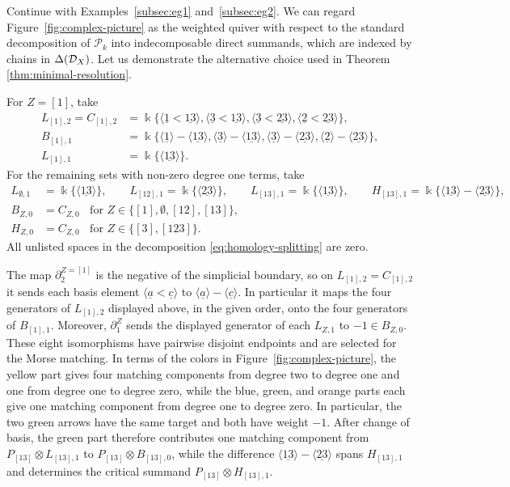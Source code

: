 \documentclass[a4paper,leqno]{amsart}
\begin{document}
\begin{eg}\label{eg:morse-matching-change-of-basis}
Continue with Examples~\ref{subsec:eg1} and~\ref{subsec:eg2}. We can regard Figure~\ref{fig:complex-picture} as the weighted quiver with respect to the standard decomposition of $\mathcal{P}_k$ into indecomposable direct summands, which are indexed by chains in $\Delta(\mathcal D_X)$. Let us demonstrate the alternative choice used in Theorem \ref{thm:minimal-resolution}.

For $Z=[1]$, take
\begin{align*}
 L_{[1],2}=C_{[1],2}
  &=\Bbbk\{
  \langle\underline{1}<\underline{13}\rangle,
  \langle\underline{3}<\underline{13}\rangle,
  \langle\underline{3}<\underline{23}\rangle,
  \langle\underline{2}<\underline{23}\rangle\},\\
 B_{[1],1}&=\Bbbk\{
  \langle\underline{1}\rangle-\langle\underline{13}\rangle,
  \langle\underline{3}\rangle-\langle\underline{13}\rangle,
  \langle\underline{3}\rangle-\langle\underline{23}\rangle,
  \langle\underline{2}\rangle-\langle\underline{23}\rangle\},\\
 L_{[1],1}&=\Bbbk\{\langle\underline{13}\rangle\}.
\end{align*}
For the remaining sets with non-zero degree one terms, take
\begin{align*}
 L_{\emptyset,1}&=\Bbbk\{\langle\underline{13}\rangle\}, \qquad L_{[12],1}=\Bbbk\{\langle\underline{23}\rangle\}, \qquad 
 L_{[13],1}=\Bbbk\{\langle\underline{13}\rangle\}, \qquad 
 H_{[13],1}=
 \Bbbk\{\langle\underline{13}\rangle-
              \langle\underline{23}\rangle\},\\
 B_{Z,0}&=C_{Z,0} \;\;\text{ for } Z\in\{[1],\emptyset,[12],[13]\},&&\\
 H_{Z,0}&=C_{Z,0} \;\;\text{ for } Z\in\{[3],[123]\}.
 &&
\end{align*}
All unlisted spaces in the decomposition \eqref{eq:homology-splitting} are zero.

The map $\partial^{Z=[1]}_2$ is the negative of the simplicial boundary, so on $L_{[1],2}=C_{[1],2}$ it sends each basis element $\langle\underline a<\underline c\rangle$ to $\langle\underline a\rangle-\langle\underline c\rangle$.  In particular it maps the four generators of $L_{[1],2}$ displayed above, in the given order, onto the four generators of $B_{[1],1}$.
Moreover, $\partial^Z_1$ sends the displayed generator of each $L_{Z,1}$ to $-1\in B_{Z,0}$.  These eight isomorphisms have pairwise disjoint endpoints and are selected for the Morse matching.  In terms of the colors in Figure~\ref{fig:complex-picture}, the yellow part gives four matching components from degree two to degree one and one from degree one to degree zero, while the blue, green, and orange parts each give one matching component from degree one to degree zero. In particular, the two green arrows have the same target and both have weight $-1$. After change of basis, the green part therefore contributes one matching component from $P_{[13]}\otimes L_{[13],1}$ to $P_{[13]}\otimes B_{[13],0}$,  while the difference $\langle\underline{13}\rangle-\langle\underline{23}\rangle$ spans $H_{[13],1}$ and determines the critical summand $P_{[13]}\otimes H_{[13],1}$.


\end{eg}
\end{document}
